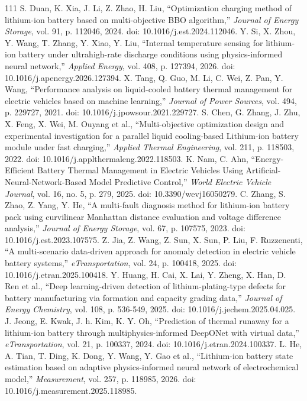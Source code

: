 \documentclass[journal]{IEEEtran}
\begin{document}
\begin{thebibliography}{111}
S. Duan, K. Xia, J. Li, Z. Zhao, H. Liu, ``Optimization charging method of lithium-ion battery based on multi-objective BBO algorithm,'' \emph{Journal of Energy Storage}, vol. 91, p. 112046, 2024. doi: 10.1016/j.est.2024.112046.
Y. Si, X. Zhou, Y. Wang, T. Zhang, Y. Xiao, Y. Liu, ``Internal temperature sensing for lithium-ion battery under ultrahigh-rate discharge conditions using physics-informed neural network,'' \emph{Applied Energy}, vol. 408, p. 127394, 2026. doi: 10.1016/j.apenergy.2026.127394.
X. Tang, Q. Guo, M. Li, C. Wei, Z. Pan, Y. Wang, ``Performance analysis on liquid-cooled battery thermal management for electric vehicles based on machine learning,'' \emph{Journal of Power Sources}, vol. 494, p. 229727, 2021. doi: 10.1016/j.jpowsour.2021.229727.
S. Chen, G. Zhang, J. Zhu, X. Feng, X. Wei, M. Ouyang et al., ``Multi-objective optimization design and experimental investigation for a parallel liquid cooling-based Lithium-ion battery module under fast charging,'' \emph{Applied Thermal Engineering}, vol. 211, p. 118503, 2022. doi: 10.1016/j.applthermaleng.2022.118503.
K. Nam, C. Ahn, ``Energy-Efficient Battery Thermal Management in Electric Vehicles Using Artificial-Neural-Network-Based Model Predictive Control,'' \emph{World Electric Vehicle Journal}, vol. 16, no. 5, p. 279, 2025. doi: 10.3390/wevj16050279.
C. Zhang, S. Zhao, Z. Yang, Y. He, ``A multi-fault diagnosis method for lithium-ion battery pack using curvilinear Manhattan distance evaluation and voltage difference analysis,'' \emph{Journal of Energy Storage}, vol. 67, p. 107575, 2023. doi: 10.1016/j.est.2023.107575.
Z. Jia, Z. Wang, Z. Sun, X. Sun, P. Liu, F. Ruzzenenti, ``A multi-scenario data-driven approach for anomaly detection in electric vehicle battery systems,'' \emph{eTransportation}, vol. 24, p. 100418, 2025. doi: 10.1016/j.etran.2025.100418.
Y. Huang, H. Cai, X. Lai, Y. Zheng, X. Han, D. Ren et al., ``Deep learning-driven detection of lithium-plating-type defects for battery manufacturing via formation and capacity grading data,'' \emph{Journal of Energy Chemistry}, vol. 108, p. 536-549, 2025. doi: 10.1016/j.jechem.2025.04.025.
J. Jeong, E. Kwak, J. h. Kim, K. Y. Oh, ``Prediction of thermal runaway for a lithium-ion battery through multiphysics-informed DeepONet with virtual data,'' \emph{eTransportation}, vol. 21, p. 100337, 2024. doi: 10.1016/j.etran.2024.100337.
L. He, A. Tian, T. Ding, K. Dong, Y. Wang, Y. Gao et al., ``Lithium-ion battery state estimation based on adaptive physics-informed neural network of electrochemical model,'' \emph{Measurement}, vol. 257, p. 118985, 2026. doi: 10.1016/j.measurement.2025.118985.

\end{thebibliography}
\end{document}
